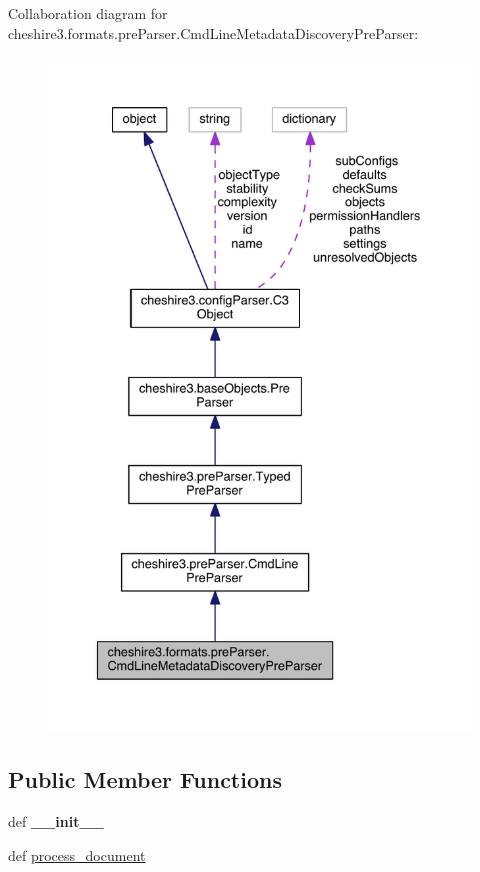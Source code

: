 Collaboration diagram for cheshire3.\-formats.\-pre\-Parser.\-Cmd\-Line\-Metadata\-Discovery\-Pre\-Parser\-:
\nopagebreak
\begin{figure}[H]
\begin{center}
\leavevmode
\includegraphics[width=337pt]{classcheshire3_1_1formats_1_1pre_parser_1_1_cmd_line_metadata_discovery_pre_parser__coll__graph}
\end{center}
\end{figure}
\subsection*{Public Member Functions}
\begin{DoxyCompactItemize}
\item 
\hypertarget{classcheshire3_1_1formats_1_1pre_parser_1_1_cmd_line_metadata_discovery_pre_parser_ac354351867493259066fe0c723d350ad}{def {\bfseries \-\_\-\-\_\-init\-\_\-\-\_\-}}\label{classcheshire3_1_1formats_1_1pre_parser_1_1_cmd_line_metadata_discovery_pre_parser_ac354351867493259066fe0c723d350ad}

\item 
def \hyperlink{classcheshire3_1_1formats_1_1pre_parser_1_1_cmd_line_metadata_discovery_pre_parser_ac4aeccd10ee197f9c71a8e953454f4c0}{process\-\_\-document}
\end{DoxyCompactItemize}
